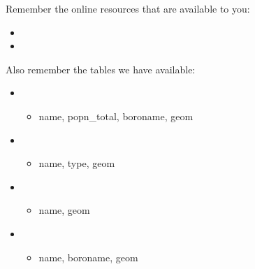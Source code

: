 \documentclass[a4paper,11pt,english]{sphinxmanual}
\begin{document}
Remember the online resources that are available to you:
\begin{itemize}
\item {} 

\item {} 

\end{itemize}

Also remember the tables we have available:
\begin{itemize}
\item {} 
\begin{itemize}
\item {} 
name, popn\_total, boroname, geom

\end{itemize}

\item {} 
\begin{itemize}
\item {} 
name, type, geom

\end{itemize}

\item {} 
\begin{itemize}
\item {} 
name, geom

\end{itemize}

\item {} 
\begin{itemize}
\item {} 
name, boroname, geom

\end{itemize}

\end{itemize}
\end{document}
